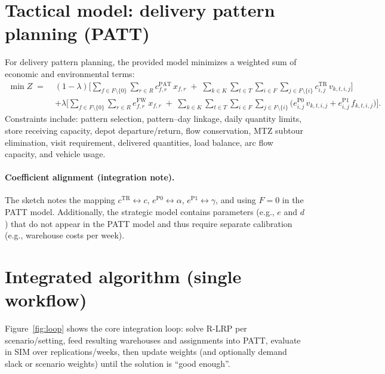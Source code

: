 \documentclass[11pt,a4paper]{article}
\begin{document}
\section{Tactical model: delivery pattern planning (PATT)}

For delivery pattern planning, the provided model minimizes a weighted sum of economic and environmental terms:
\begin{align}
  \min Z \;=\; &(1-\lambda)\Bigg[
  \sum_{f\in F\setminus\{0\}}\sum_{r\in R} c^{\text{PAT}}_{f,r}\, x_{f,r}
  \;+\;\sum_{k\in K}\sum_{t\in T}\sum_{i\in F}\sum_{j\in F\setminus\{i\}}
  c^{\text{TR}}_{i,j}\, v_{k,t,i,j}
  \Bigg] \nonumber\\
  &+\lambda\Bigg[
  \sum_{f\in F\setminus\{0\}}\sum_{r\in R} e^{\text{FW}}_{f,r}\, x_{f,r}
  \;+\;\sum_{k\in K}\sum_{t\in T}\sum_{i\in F}\sum_{j\in F\setminus\{i\}}
  \bigl(e^{\text{P0}}_{i,j}\, v_{k,t,i,j} + e^{\text{P1}}_{i,j}\, f_{k,t,i,j}\bigr)
  \Bigg].
  \label{eq:patt-obj}
\end{align}
Constraints include: pattern selection, pattern--day linkage, daily quantity limits, store receiving capacity,
depot departure/return, flow conservation, MTZ subtour elimination, visit requirement, delivered quantities,
load balance, arc flow capacity, and vehicle usage.

\paragraph{Coefficient alignment (integration note).}
The sketch notes the mapping
$c^{\text{TR}}\leftrightarrow c$, $e^{\text{P0}}\leftrightarrow \alpha$, $e^{\text{P1}}\leftrightarrow \gamma$,
and using $F=0$ in the PATT model. Additionally, the strategic model contains parameters (e.g., $e$ and $d$)
that do not appear in the PATT model and thus require separate calibration (e.g., warehouse costs per week).

\section{Integrated algorithm (single workflow)}

Figure~\ref{fig:loop} shows the core integration loop:
solve R-LRP per scenario/setting, feed resulting warehouses and assignments into PATT,
evaluate in SIM over replications/weeks, then update weights (and optionally demand slack or scenario weights)
until the solution is ``good enough''.
\end{document}
